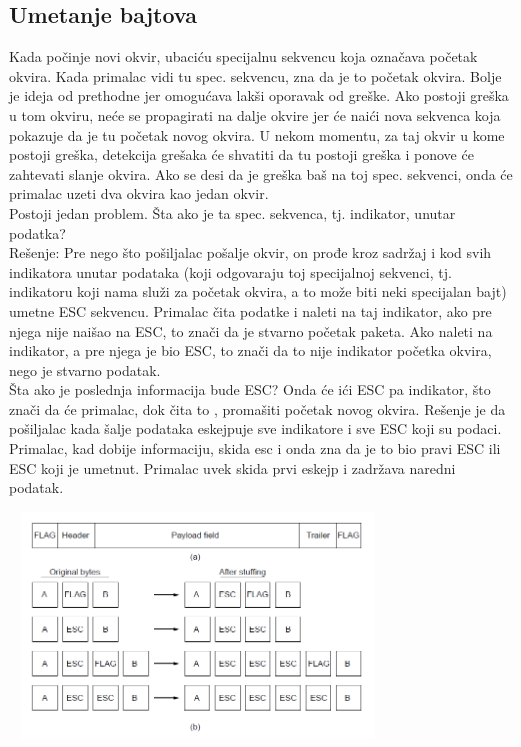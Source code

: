 \documentclass{article} %
\begin{document}
\subsection{Umetanje bajtova}
Kada počinje novi okvir, ubaciću specijalnu sekvencu koja označava početak okvira. Kada primalac vidi tu spec. sekvencu, zna da je to početak okvira. Bolje je ideja od prethodne jer omogućava lakši oporavak od greške. Ako postoji greška u tom okviru, neće se propagirati na dalje okvire jer će naići nova sekvenca koja pokazuje da je tu početak novog okvira. U nekom momentu, za taj okvir u kome postoji greška, detekcija grešaka će shvatiti da tu postoji greška i ponove će zahtevati slanje okvira. Ako se desi da je greška baš na toj spec. sekvenci, onda će primalac uzeti dva okvira kao jedan okvir.  \\

Postoji jedan problem. Šta ako je ta spec. sekvenca, tj. indikator, unutar podatka?\\
Rešenje: Pre nego što pošiljalac pošalje okvir, on prođe kroz sadržaj i kod svih indikatora unutar podataka (koji odgovaraju toj specijalnoj sekvenci, tj. indikatoru koji nama služi za početak okvira, a to može biti neki specijalan bajt) umetne ESC sekvencu. Primalac čita podatke i naleti na taj indikator, ako pre njega nije naišao na ESC, to znači da je stvarno početak paketa. Ako naleti na indikator, a pre njega je bio ESC, to znači da to nije indikator početka okvira, nego je stvarno podatak. \\

Šta ako je poslednja informacija bude ESC? Onda će ići ESC pa indikator, što znači da će primalac, dok čita to , promašiti početak novog okvira. Rešenje je da pošiljalac kada šalje podataka eskejpuje sve indikatore i sve ESC koji su podaci. Primalac, kad dobije informaciju, skida esc i onda zna da je to bio pravi ESC ili ESC koji je umetnut. Primalac uvek skida prvi eskejp i zadržava naredni podatak. 
\begin{center}
\includegraphics[width=10cm, height=6cm]{umetanjeBajtova}\\
\end{center}
\end{document}
